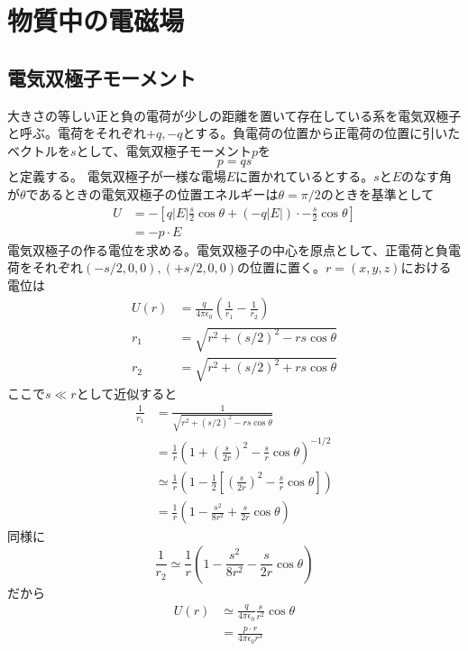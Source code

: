 \section{物質中の電磁場}

\subsection{電気双極子モーメント}
    大きさの等しい正と負の電荷が少しの距離を置いて存在している系を電気双極子と呼ぶ。電荷をそれぞれ$+q, -q$とする。負電荷の位置から正電荷の位置に引いたベクトルを$s$として、電気双極子モーメント$p$を
        \[p = qs\]
    と定義する。
    電気双極子が一様な電場$E$に置かれているとする。$s$と$E$のなす角が$\theta$であるときの電気双極子の位置エネルギーは$\theta = \pi / 2$のときを基準として
    \begin{align*}
        U   &= -\left[q|E|\frac{s}{2}\cos\theta + (-q|E|) \cdot -\frac{s}{2}\cos\theta\right]\\
            &= -p \cdot E
    \end{align*}
    電気双極子の作る電位を求める。電気双極子の中心を原点として、正電荷と負電荷をそれぞれ$(-s/2, 0, 0), (+s/2, 0, 0)$の位置に置く。$r = (x, y, z)$における電位は
    \begin{align*}
        U(r) &= \frac{q}{4\pi\epsilon_0}\left(\frac{1}{r_1} - \frac{1}{r_2}\right)\\
        r_1 &= \sqrt{r^2 + (s/2)^2 - rs\cos\theta}\\
        r_2 &= \sqrt{r^2 + (s/2)^2 + rs\cos\theta}
    \end{align*}
    ここで$s \ll r$として近似すると
    \begin{align*}
        \frac{1}{r_1}
            &= \frac{1}{\sqrt{r^2 + (s/2)^2 - rs\cos\theta}}\\
            &= \frac{1}{r}\left(1 + \left(\frac{s}{2r}\right)^2 - \frac{s}{r}\cos\theta\right)^{-1/2}\\
            &\simeq \frac{1}{r}\left(1 - \frac{1}{2}\left[\left(\frac{s}{2r}\right)^2 - \frac{s}{r}\cos\theta\right]\right)\\
            &= \frac{1}{r}\left(1 - \frac{s^2}{8r^2} + \frac{s}{2r}\cos\theta\right)
    \end{align*}
    同様に
        \[\frac{1}{r_2} \simeq \frac{1}{r}\left(1 - \frac{s^2}{8r^2} - \frac{s}{2r}\cos\theta\right)\]
    だから
    \begin{align*}
        U(r)
            &\simeq \frac{q}{4\pi\epsilon_0}\frac{s}{r^2}\cos\theta\\
            &= \frac{p \cdot r}{4\pi\epsilon_0r^3}
    \end{align*}
